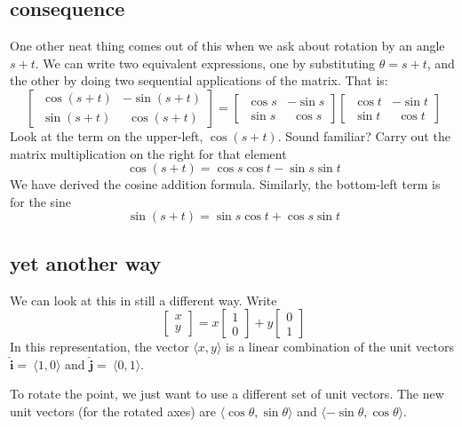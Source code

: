 \documentclass[11pt, oneside]{article}   	%
\begin{document}
\subsection*{consequence}

One other neat thing comes out of this when we ask about rotation by an angle $s + t$.  We can write two equivalent expressions, one by substituting $\theta=s+t$, and the other by doing two sequential applications of the matrix.  That is:
\[
\begin{bmatrix}   \ \cos (s+t) & -\sin (s+t)  \\  \ \sin (s+t) & \ \ \cos (s+t)  \end{bmatrix} =
\begin{bmatrix}   \ \cos s & -\sin s  \\  \ \sin s & \ \ \cos s  \end{bmatrix}
\begin{bmatrix}   \ \cos t & -\sin t  \\  \ \sin t & \ \ \cos t  \end{bmatrix}
\]
Look at the term on the upper-left, $\cos(s+t)$.  Sound familiar?  Carry out the matrix multiplication on the right for that element
\[ \cos(s+t) = \cos s \cos t - \sin s \sin t \]
We have derived the cosine addition formula.  Similarly, the bottom-left term is for the sine
\[ \sin(s+t) = \sin s \cos t + \cos s \sin t \]

\subsection*{yet another way}
We can look at this in still a different way.  Write
\[
\begin{bmatrix}  x \\ y \end{bmatrix}
=
x
\begin{bmatrix}  1 \\ 0 \end{bmatrix}
+
y
\begin{bmatrix}  0 \\ 1 \end{bmatrix}
\]
In this representation, the vector $\langle x,y \rangle$ is a linear combination of the unit vectors $\mathbf{\hat{i}} =\ \langle 1,0 \rangle$ and $\mathbf{\hat{j}}  =\ \langle 0,1 \rangle$.

To rotate the point, we just want to use a different set of unit vectors.  The new unit vectors (for the rotated axes) are $\langle \cos \theta,\sin \theta \rangle$ and $\langle -\sin \theta,\cos \theta \rangle$.  
\end{document}

